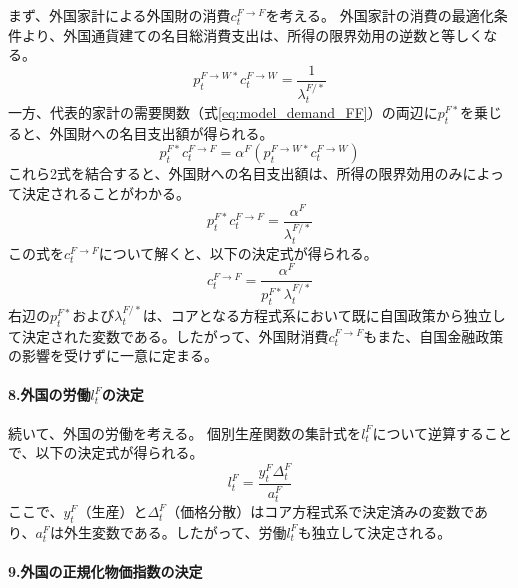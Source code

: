 まず、外国家計による外国財の消費\(c_t^{F\to F}\)を考える。
外国家計の消費の最適化条件より、外国通貨建ての名目総消費支出は、所得の限界効用の逆数と等しくなる。
\begin{equation}
p_t^{F\to W*}c_t^{F\to W}=\frac{1}{\lambda_t^{F/*}}
\label{eq:appendix_insulation_effect_other_cff_budget}
\end{equation}
一方、代表的家計の需要関数（式\eqref{eq:model_demand_FF}）の両辺に\(p_t^{F*}\)を乗じると、外国財への名目支出額が得られる。
\begin{equation}
p_t^{F*}c_t^{F\to F}=\alpha^F(p_t^{F\to W*}c_t^{F\to W})
\label{eq:appendix_insulation_effect_other_cff_nom_exp}
\end{equation}
これら2式を結合すると、外国財への名目支出額は、所得の限界効用のみによって決定されることがわかる。
\begin{equation}
p_t^{F*}c_t^{F\to F}=\frac{\alpha^F}{\lambda_t^{F/*}}
\label{eq:appendix_insulation_effect_other_cff_combined}
\end{equation}
この式を\(c_t^{F\to F}\)について解くと、以下の決定式が得られる。
\begin{equation}
    c_t^{F\to F}=\frac{\alpha^F}{p_t^{F*}\lambda_t^{F/*}}
    \label{eq:appendix_insulation_effect_other_cff_final}
\end{equation}
右辺の\(p_t^{F*}\)および\(\lambda_t^{F/*}\)は、コアとなる方程式系において既に自国政策から独立して決定された変数である。したがって、外国財消費\(c_t^{F\to F}\)もまた、自国金融政策の影響を受けずに一意に定まる。

\paragraph{8.外国の労働\(l_t^F\)の決定}
\label{sec:appendix_insulation_effect_other_labor}

続いて、外国の労働を考える。
個別生産関数の集計式を\(l_t^F\)について逆算することで、以下の決定式が得られる。
\begin{equation}
    l_t^F=\frac{y_t^F\Delta_t^F}{a_t^F}
    \label{eq:appendix_insulation_effect_other_labor_final}
\end{equation}
ここで、\(y_t^F\)（生産）と\(\Delta_t^F\)（価格分散）はコア方程式系で決定済みの変数であり、\(a_t^F\)は外生変数である。したがって、労働\(l_t^F\)も独立して決定される。

\paragraph{9.外国の正規化物価指数の決定}
\label{sec:appendix_insulation_effect_other_ppi}

